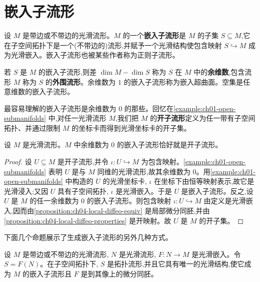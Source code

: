 \documentclass[../../main.tex]{subfiles}
\begin{document}
\section{嵌入子流形}\label{section:ch05-嵌入子流形}

设 $M$ 是带边或不带边的光滑流形。$M$ 的一个\textbf{嵌入子流形}是 $M$ 的子集 $S\subseteq M$,它在子空间拓扑下是一个(不带边的)流形,并赋予一个光滑结构使包含映射 $S\hookrightarrow M$ 成为光滑嵌入。嵌入子流形也被某些作者称为正则子流形。

若 $S$ 是 $M$ 的嵌入子流形,则差 $\dim M-\dim S$ 称为 $S$ 在 $M$ 中的\textbf{余维数},包含流形 $M$ 称为 $S$ 的\textbf{外围流形}。余维数为 $1$ 的嵌入子流形称为嵌入超曲面。空集是任意维数的嵌入子流形。

最容易理解的嵌入子流形是余维数为 $0$ 的那些。回忆在\cref{example:ch01-open-submanifolds} 中,对任一光滑流形 $M$,我们把 $M$ 的\textbf{开子流形}定义为任一带有子空间拓扑、并通过限制 $M$ 的坐标卡而得到光滑坐标卡的开子集。

\begin{proposition}\label{proposition:ch05-open-submanifolds}
设 $M$ 是光滑流形。$M$ 中余维数为 $0$ 的嵌入子流形恰好就是开子流形。
\end{proposition}

\begin{proof}
设 $U\subseteq M$ 是开子流形,并令 $\iota:U\hookrightarrow M$ 为包含映射。\cref{example:ch01-open-submanifolds} 表明 $U$ 是与 $M$ 同维的光滑流形,故其余维数为 $0$。用\cref{example:ch01-open-submanifolds} 中构造的 $U$ 的光滑坐标卡, $\iota$ 在坐标下由恒等映射表示,故它是光滑浸入;又因 $U$ 具有子空间拓扑, $\iota$ 是光滑嵌入。于是 $U$ 是嵌入子流形。反之,设 $U$ 是 $M$ 的任一余维数为 $0$ 的嵌入子流形。则包含映射 $\iota:U\hookrightarrow M$ 由定义是光滑嵌入,因而由\cref{proposition:ch04-local-diffeo-equiv} 是局部微分同胚,并由\cref{proposition:ch04-local-diffeo-properties} 是开映射。故 $U$ 是 $M$ 的开子集。
\end{proof}

下面几个命题展示了生成嵌入子流形的另外几种方式。

\begin{proposition}\label{proposition:ch05-images-of-embeddings}
设 $M$ 是带边或不带边的光滑流形, $N$ 是光滑流形, $F:N\to M$ 是光滑嵌入。令 $S=F(N)$。在子空间拓扑下, $S$ 是拓扑流形,并且它具有唯一的光滑结构,使它成为 $M$ 的嵌入子流形且 $F$ 是到其像上的微分同胚。
\end{proposition}
\end{document}

